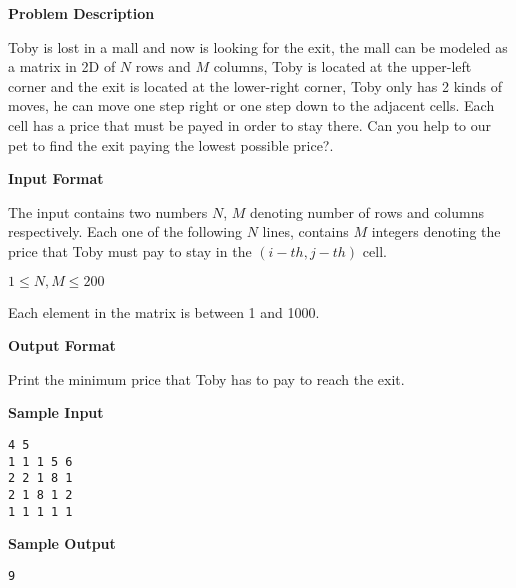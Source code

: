 \textbf{\large Problem Description}

Toby is lost in a mall and now is looking for the exit, the mall can be modeled
as a matrix in 2D of $N$ rows and $M$ columns, Toby is located at the upper-left
corner and the exit is located at the lower-right corner, Toby only has 2
kinds of moves, he can move one step right or one step down to the adjacent
cells. Each cell has a price that must be payed in order to stay there.
Can you help to our pet to find the exit paying the lowest possible price?.

\textbf{\large Input Format}

The input contains two numbers $N$, $M$ denoting number of rows and columns respectively.
Each one of the following $N$ lines, contains $M$ integers denoting the price that
Toby must pay to stay in the $(i-th, j-th)$ cell.

$1 \le N, M \le 200$

Each element in the matrix is between 1 and 1000.

\textbf{\large Output Format}

Print the minimum price that Toby has to pay to reach the exit.

\textbf{\large Sample Input}

\begin{verbatim}
4 5
1 1 1 5 6
2 2 1 8 1
2 1 8 1 2
1 1 1 1 1
\end{verbatim}

\textbf{\large Sample Output}

\begin{verbatim}
9
\end{verbatim}

\newpage
